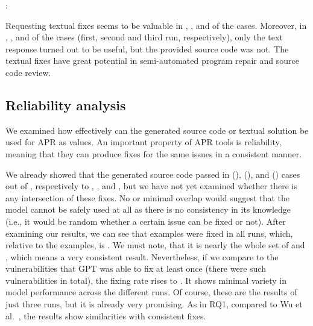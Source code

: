 \begin{framed}
	\noindent {}: \textbf{\secondthesisrqtwo}
	
	\noindent Requesting textual fixes seems to be valuable in , , and  of the cases.
	Moreover, in , , and  of the cases (first, second and third run, respectively), only the text response turned out to be useful, but the provided source code was not.
	The textual fixes have great potential in semi-automated program repair and source code review.
\end{framed}


\subsection{Reliability analysis}

We examined how effectively can the generated source code or textual solution be used for APR as \topone values.
An important property of APR tools is reliability, meaning that they can produce fixes for the same issues in a consistent manner.


We already showed that the generated source code passed in  (),  (), and  () cases out of \alltestcount{}, respectively to , , and , but we have not yet examined whether there is any intersection of these fixes.
No or minimal overlap would suggest that the model cannot be safely used at all as there is no consistency in its knowledge (i.e., it would be random whether a certain issue can be fixed or not).
After examining our results, we can see that \consistentcount{} examples were fixed in all runs, which, relative to the \alltestcount{} examples, is \consistentrat{}.
We must note, that it is nearly the whole set of  and , which means a very consistent result.
Nevertheless, if we compare to the vulnerabilities that GPT was able to fix at least once (there were \allvulncount{} such vulnerabilities in total), the fixing rate rises to \consistentrathigher{}.
It shows minimal variety in model performance across the different runs.
Of course, these are the results of just three runs, but it is already very promising.
As in RQ1, compared to Wu et al.~\cite{same_as_us_but_too_much_hint}, the results show similarities with consistent fixes.



